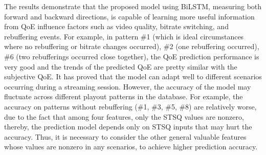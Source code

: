 The results demonstrate that the proposed model using BiLSTM, measuring both forward and backward directions, is capable of learning more useful information from QoE influence factors such as video quality, bitrate switching, and rebuffering events.
For example, in pattern \#1 (which is ideal circumstances where no rebuffering or bitrate changes occurred), \#2 (one rebuffering occurred), \#6 (two rebufferings occurred close together), the QoE prediction performance is very good and the trends of the predicted QoE are pretty similar with the subjective QoE.
It has proved that the model can adapt well to different scenarios occurring during a streaming session.
However, the accuracy of the model may fluctuate across different playout patterns in the database.
For example, the accuracy on patterns without rebuffering (\#1, \#3, \#5, \#8) are relatively worse, due to the fact that among four features, only the STSQ values are nonzero, thereby, the prediction model depends only on STSQ inputs that may hurt the accuracy.
Thus, it is necessary to consider the other general valuable features whose values are nonzero in any scenarios, to achieve higher prediction accuracy.